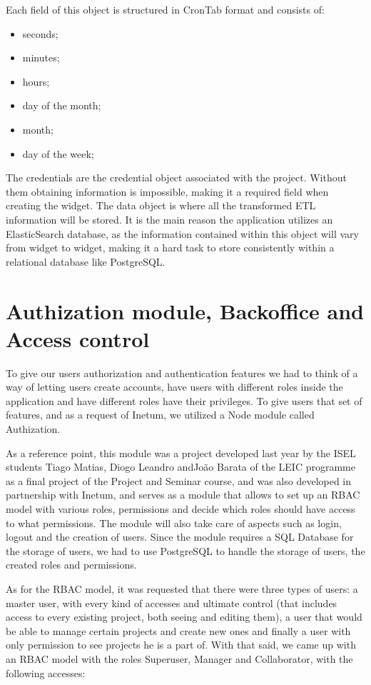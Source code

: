 \documentclass[a4paper,twoside,10pt]{report}
\begin{document}
Each field of this object is structured in CronTab format and consists of:
\begin{itemize}
  \item seconds;
  \item minutes;
  \item hours;
  \item day of the month;
  \item month;
  \item day of the week;
\end{itemize}
The credentials are the credential object associated with the project.
\newline
Without them obtaining information is impossible, making it a required field when creating the widget.
\newline
The data object is where all the transformed ETL information will be stored. It is the main reason the application utilizes an ElasticSearch database, as the information contained within this object will vary from widget to widget, making it a hard task to store consistently within a relational database like PostgreSQL.


\newpage
\section{Authization module, Backoffice and Access control}
 To give our users authorization and authentication features we had to think of a way of letting users create accounts, have users with different roles inside the application and have different roles have their privileges. To give users that set of features, and as a request of Inetum, we utilized a Node module called Authization\cite{AUTHIZATION}. 

As a reference point, this module was a project developed last year by the ISEL students Tiago Matias, Diogo Leandro andJoão Barata of the LEIC programme as a final project of the Project and Seminar course, and was also developed in partnership with Inetum, and serves as a module that allows to set up an RBAC model with various roles, permissions and decide which roles should have access to what permissions. The module will also take care of aspects such as login, logout and the creation of users. Since the module requires a SQL Database for the storage of users, we had to use  PostgreSQL\cite{POSTGRESQL} to handle the storage of users, the created roles and permissions.

As for the RBAC model, it was requested that there were three types of users: a master user, with every kind of accesses and ultimate control (that includes access to every existing project, both seeing and editing them), a user that would be able to manage certain projects and create new ones and finally a user with only permission to see projects he is a part of.
With that said, we came up with an RBAC model with the roles Superuser, Manager and Collaborator, with the following accesses:
\\ \newline
\end{document}
